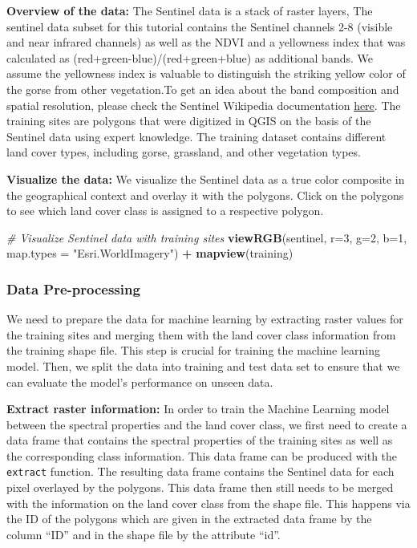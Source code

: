 \documentclass[
]{article}
\newenvironment{Shaded}{\begin{snugshade}}{\end{snugshade}}
\newcommand{\AttributeTok}[1]{\textcolor[rgb]{0.13,0.29,0.53}{#1}}
\newcommand{\CommentTok}[1]{\textcolor[rgb]{0.56,0.35,0.01}{\textit{#1}}}
\newcommand{\DecValTok}[1]{\textcolor[rgb]{0.00,0.00,0.81}{#1}}
\newcommand{\FunctionTok}[1]{\textcolor[rgb]{0.13,0.29,0.53}{\textbf{#1}}}
\newcommand{\NormalTok}[1]{#1}
\newcommand{\SpecialCharTok}[1]{\textcolor[rgb]{0.81,0.36,0.00}{\textbf{#1}}}
\newcommand{\StringTok}[1]{\textcolor[rgb]{0.31,0.60,0.02}{#1}}
\begin{document}
\textbf{Overview of the data:} The Sentinel data is a stack of raster
layers, The sentinel data subset for this tutorial contains the Sentinel
channels 2-8 (visible and near infrared channels) as well as the NDVI
and a yellowness index that was calculated as
(red+green-blue)/(red+green+blue) as additional bands. We assume the
yellowness index is valuable to distinguish the striking yellow color of
the gorse from other vegetation.To get an idea about the band
composition and spatial resolution, please check the Sentinel Wikipedia
documentation
\href{https://en.wikipedia.org/wiki/Sentinel-2\#Data_products}{here}.
The training sites are polygons that were digitized in QGIS on the basis
of the Sentinel data using expert knowledge. The training dataset
contains different land cover types, including gorse, grassland, and
other vegetation types.

\textbf{Visualize the data:} We visualize the Sentinel data as a true
color composite in the geographical context and overlay it with the
polygons. Click on the polygons to see which land cover class is
assigned to a respective polygon.

\begin{Shaded}
\begin{Highlighting}[]
\CommentTok{\# Visualize Sentinel data with training sites}
\FunctionTok{viewRGB}\NormalTok{(sentinel, }\AttributeTok{r=}\DecValTok{3}\NormalTok{, }\AttributeTok{g=}\DecValTok{2}\NormalTok{, }\AttributeTok{b=}\DecValTok{1}\NormalTok{, }\AttributeTok{map.types =} \StringTok{"Esri.WorldImagery"}\NormalTok{) }\SpecialCharTok{+} 
  \FunctionTok{mapview}\NormalTok{(training)}
\end{Highlighting}
\end{Shaded}

\subsubsection{Data Pre-processing}\label{data-pre-processing}

We need to prepare the data for machine learning by extracting raster
values for the training sites and merging them with the land cover class
information from the training shape file. This step is crucial for
training the machine learning model. Then, we split the data into
training and test data set to ensure that we can evaluate the model's
performance on unseen data.

\textbf{Extract raster information:} In order to train the Machine
Learning model between the spectral properties and the land cover class,
we first need to create a data frame that contains the spectral
properties of the training sites as well as the corresponding class
information. This data frame can be produced with the \texttt{extract}
function. The resulting data frame contains the Sentinel data for each
pixel overlayed by the polygons. This data frame then still needs to be
merged with the information on the land cover class from the shape file.
This happens via the ID of the polygons which are given in the extracted
data frame by the column ``ID'' and in the shape file by the attribute
``id''.
\end{document}
